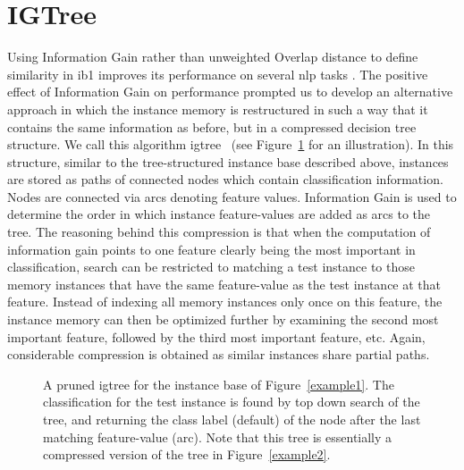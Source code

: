 \documentclass{report}
\begin{document}
\section{IGTree}
\label{igtree}

Using Information Gain rather than unweighted Overlap distance to
define similarity in {\sc ib1} improves its performance on several
{\sc nlp} tasks \cite{Daelemans+92b,VandenBosch+93,VandenBosch97}.
The positive effect of Information Gain on performance prompted us to
develop an alternative approach in which the instance memory is
restructured in such a way that it contains the same information as
before, but in a compressed decision tree structure. We call this
algorithm {\sc igtree}~\cite{Daelemans+97} (see Figure~\ref{example3}
for an illustration). In this structure, similar to the
tree-structured instance base described above, instances are stored as
paths of connected nodes which contain classification
information. Nodes are connected via arcs denoting feature
values. Information Gain is used to determine the order in which
instance feature-values are added as arcs to the tree. The reasoning
behind this compression is that when the computation of information
gain points to one feature clearly being the most important in
classification, search can be restricted to matching a test instance
to those memory instances that have the same feature-value as the test
instance at that feature. Instead of indexing all memory instances
only once on this feature, the instance memory can then be optimized
further by examining the second most important feature, followed by
the third most important feature, etc.  Again, considerable
compression is obtained as similar instances share partial paths.

\begin{figure}[htb]
        \begin{center}
                \leavevmode
                \epsfxsize=10cm
                \caption{A pruned {\sc igtree} for the instance base
                of Figure~\ref{example1}. The classification for
                the test instance is found by top down search of the
                tree, and returning the class label (default) of the
                node after the last matching feature-value (arc). Note
                that this tree is essentially a compressed version of
                the tree in Figure~\ref{example2}.
                }
                \label{example3}
        \end{center}
\end{figure}
\end{document}
